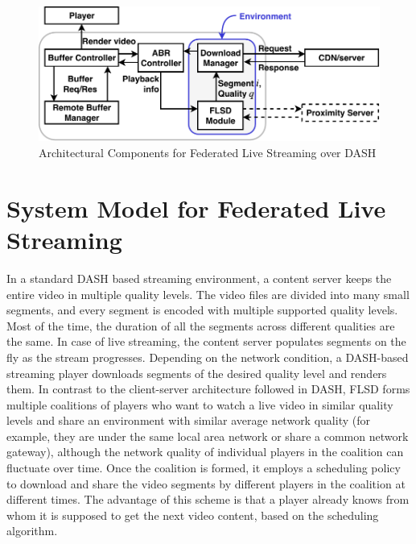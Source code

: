 \begin{figure}[!t]
	\centering
	\includegraphics[width=0.8\linewidth]{img/PlayerDiagram}
	\caption{\label{fig:playerdiagram} Architectural Components for Federated Live Streaming over DASH}
\end{figure}

\section{System Model for Federated Live Streaming}
\label{section:systemDesign}
In a standard DASH based streaming environment, a content server keeps the entire video in multiple quality levels. The video files are divided into many small segments, and every segment is encoded with multiple supported quality levels. Most of the time, the duration of all the segments across different qualities are the same. In case of live streaming, the content server populates segments on the fly as the stream progresses. Depending on the network condition, a DASH-based streaming player downloads segments of the desired quality level and renders them.
In contrast to the client-server architecture followed in DASH, FLSD forms multiple coalitions of players who want to watch a live video in similar quality levels and share an environment with similar average network quality (for example, they are under the same local area network or share a common network gateway), although the network quality of individual players in the coalition can fluctuate over time. Once the coalition is formed, it employs a scheduling policy to download and share the video segments by different players in the coalition at different times. The advantage of this scheme is that a player already knows from whom it is supposed to get the next video content, based on the scheduling algorithm.  


